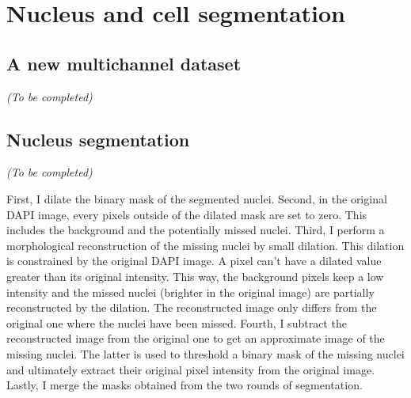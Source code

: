 
\section{Nucleus and cell segmentation}
\label{sec:segmentation_nuc_cell}

\subsection{A new multichannel dataset}
\label{subsec:segmentation_data}

\begin{center}
	\textit{(To be completed)}
\end{center}


\subsection{Nucleus segmentation}
\label{subsec:segmentation_nuc}

\begin{center}
	\textit{(To be completed)}
\end{center}



First, I dilate the binary mask of the segmented nuclei.
Second, in the original DAPI image, every pixels outside of the dilated mask are set to zero.
This includes the background and the potentially missed nuclei.
Third, I perform a morphological reconstruction of the missing nuclei by small dilation.
This dilation is constrained by the original DAPI image.
A pixel can't have a dilated value greater than its original intensity.
This way, the background pixels keep a low intensity and the missed nuclei (brighter in the original image) are partially reconstructed by the dilation.
The reconstructed image only differs from the original one where the nuclei have been missed.
Fourth, I subtract the reconstructed image from the original one to get an approximate image of the missing nuclei.
The latter is used to threshold a binary mask of the missing nuclei and ultimately extract their original pixel intensity from the original image.
Lastly, I merge the masks obtained from the two rounds of segmentation.


